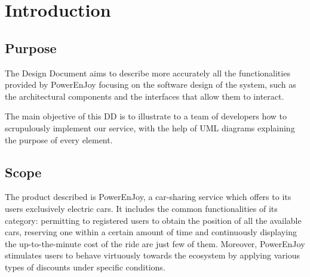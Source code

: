 \chapter{Introduction}

\section{Purpose}
The Design Document aims to describe more accurately all the functionalities provided by PowerEnJoy focusing on the software design of the system, such as the architectural components and the interfaces that allow them to interact.

The main objective of this DD is to illustrate to a team of developers how to scrupulously implement our service, with the help of UML diagrams explaining the purpose of every element.

\section{Scope}
The product described is PowerEnJoy, a car-sharing service which offers to its users exclusively electric cars. It includes the common functionalities of its category: permitting to registered users to obtain the position of all the available cars, reserving one within a certain amount of time and continuously displaying the up-to-the-minute cost of the ride are just few of them. Moreover, PowerEnJoy stimulates users to behave virtuously towards the ecosystem by applying various types of discounts under specific conditions.


